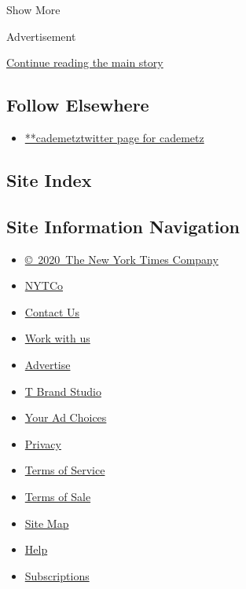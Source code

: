 Show More

Advertisement

\protect\hyperlink{after-mid2}{Continue reading the main story}

\hypertarget{follow-elsewhere}{%
\subsection{Follow Elsewhere}\label{follow-elsewhere}}

\begin{itemize}
\tightlist
\item
  \href{https://twitter.com/cademetz}{**cademetztwitter page for
  cademetz}
\end{itemize}

\hypertarget{site-index}{%
\subsection{Site Index}\label{site-index}}

\hypertarget{site-information-navigation}{%
\subsection{Site Information
Navigation}\label{site-information-navigation}}

\begin{itemize}
\tightlist
\item
  \href{https://help.nytimes.com/hc/en-us/articles/115014792127-Copyright-notice}{©~2020~The
  New York Times Company}
\end{itemize}

\begin{itemize}
\tightlist
\item
  \href{https://www.nytco.com/}{NYTCo}
\item
  \href{https://help.nytimes.com/hc/en-us/articles/115015385887-Contact-Us}{Contact
  Us}
\item
  \href{https://www.nytco.com/careers/}{Work with us}
\item
  \href{https://nytmediakit.com/}{Advertise}
\item
  \href{http://www.tbrandstudio.com/}{T Brand Studio}
\item
  \href{https://www.nytimes.com/privacy/cookie-policy\#how-do-i-manage-trackers}{Your
  Ad Choices}
\item
  \href{https://www.nytimes.com/privacy}{Privacy}
\item
  \href{https://help.nytimes.com/hc/en-us/articles/115014893428-Terms-of-service}{Terms
  of Service}
\item
  \href{https://help.nytimes.com/hc/en-us/articles/115014893968-Terms-of-sale}{Terms
  of Sale}
\item
  \href{https://spiderbites.nytimes.com}{Site Map}
\item
  \href{https://help.nytimes.com/hc/en-us}{Help}
\item
  \href{https://www.nytimes.com/subscription?campaignId=37WXW}{Subscriptions}
\end{itemize}
